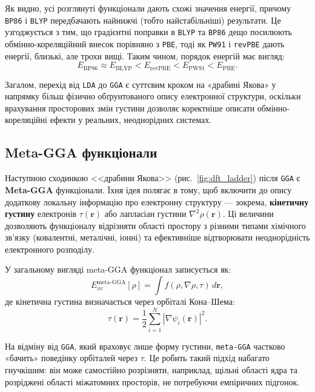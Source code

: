 Як видно, усі розглянуті функціонали дають схожі значення енергії, причому \texttt{BP86} і \texttt{BLYP} передбачають найнижчі (тобто найстабільніші) результати. Це узгоджується з тим, що градієнтні поправки в \texttt{BLYP} та \texttt{BP86} дещо посилюють обмінно-кореляційний внесок порівняно з \texttt{PBE}, тоді як \texttt{PW91} і \texttt{revPBE} дають енергії, близькі, але трохи вищі. Таким чином, порядок енергій має вигляд:
\[
E_{\text{BP86}} \approx E_{\text{BLYP}} < E_{\text{revPBE}} < E_{\text{PW91}} < E_{\text{PBE}}.
\]





Загалом, перехід від \texttt{LDA} до \texttt{GGA} є суттєвим кроком на «драбині Якова» у напрямку більш фізично обґрунтованого опису електронної структури, оскільки врахування просторових змін густини дозволяє коректніше описати обмінно-кореляційні ефекти у реальних, неоднорідних системах.


\subsection{Meta-GGA функціонали}

Наступною сходинкою <<драбини Якова>> (рис.~\ref{fig:dft_ladder}) після \texttt{GGA} є \textbf{Meta-GGA} функціонали.
Їхня ідея полягає в тому, щоб включити до опису додаткову локальну інформацію про електронну структуру --- зокрема, \textbf{кінетичну густину} електронів $\tau(\mathbf{r})$ або лапласіан густини $\nabla^2\rho(\mathbf{r})$.
Ці величини дозволяють функціоналу відрізняти області простору з різними типами хімічного зв’язку (ковалентні, металічні, іонні) та ефективніше відтворювати неоднорідність електронного розподілу.

У загальному вигляді meta-GGA функціонал записується як:
\begin{equation}
E_{xc}^{\text{meta-GGA}}[\rho] = \int f(\rho, \nabla\rho, \tau)\, d\mathbf{r},
\end{equation}
де кінетична густина визначається через орбіталі Кона–Шема:
\begin{equation}
\tau(\mathbf{r}) = \frac{1}{2} \sum_{i=1}^{N} |\nabla\psi_i(\mathbf{r})|^2.
\end{equation}

На відміну від \texttt{GGA}, який враховує лише форму густини, \texttt{meta-GGA} частково «бачить» поведінку орбіталей через $\tau$.
Це робить такий підхід набагато гнучкішим: він може самостійно розрізняти, наприклад, щільні області ядра та розріджені області міжатомних просторів, не потребуючи емпіричних підгонок.


